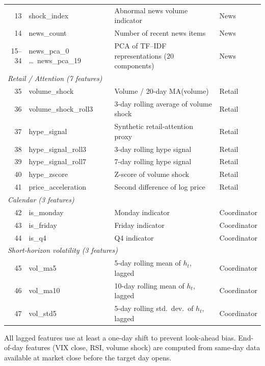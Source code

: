 \documentclass[review]{elsarticle}
\begin{document}
\begin{table}[H]
\begin{tabular}{rlll}
13 & shock\_index & Abnormal news volume indicator & News \\
14 & news\_count & Number of recent news items & News \\
15--34 & news\_pca\_0 \ldots\ news\_pca\_19 & PCA of TF--IDF representations (20 components) & News \\
\midrule
\multicolumn{4}{l}{\textit{Retail / Attention (7 features)}} \\
35 & volume\_shock & Volume / 20-day MA(volume) & Retail \\
36 & volume\_shock\_roll3 & 3-day rolling average of volume shock & Retail \\
37 & hype\_signal & Synthetic retail-attention proxy & Retail \\
38 & hype\_signal\_roll3 & 3-day rolling hype signal & Retail \\
39 & hype\_signal\_roll7 & 7-day rolling hype signal & Retail \\
40 & hype\_zscore & Z-score of volume shock & Retail \\
41 & price\_acceleration & Second difference of log price & Retail \\
\midrule
\multicolumn{4}{l}{\textit{Calendar (3 features)}} \\
42 & is\_monday & Monday indicator & Coordinator \\
43 & is\_friday & Friday indicator & Coordinator \\
44 & is\_q4 & Q4 indicator & Coordinator \\
\midrule
\multicolumn{4}{l}{\textit{Short-horizon volatility (3 features)}} \\
45 & vol\_ma5 & 5-day rolling mean of $h_t$, lagged & Coordinator \\
46 & vol\_ma10 & 10-day rolling mean of $h_t$, lagged & Coordinator \\
47 & vol\_std5 & 5-day rolling std.\ dev.\ of $h_t$, lagged & Coordinator \\
\bottomrule
\end{tabular}
\normalsize
\end{table}

All lagged features use at least a one-day shift to prevent look-ahead bias. End-of-day features (VIX close, RSI, volume shock) are computed from same-day data available at market close before the target day opens.
\end{document}
